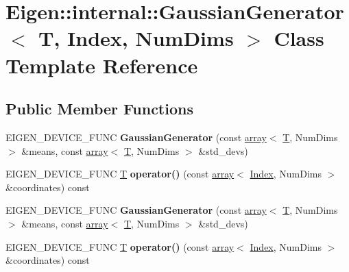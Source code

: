 \hypertarget{class_eigen_1_1internal_1_1_gaussian_generator}{}\section{Eigen\+:\+:internal\+:\+:Gaussian\+Generator$<$ T, Index, Num\+Dims $>$ Class Template Reference}
\label{class_eigen_1_1internal_1_1_gaussian_generator}
\subsection*{Public Member Functions}
\begin{DoxyCompactItemize}
\item 
\mbox{\label{class_eigen_1_1internal_1_1_gaussian_generator_a54fa35a51a93200db4469b4b2b288ea4}} 
E\+I\+G\+E\+N\+\_\+\+D\+E\+V\+I\+C\+E\+\_\+\+F\+U\+NC {\bfseries Gaussian\+Generator} (const \hyperlink{class_eigen_1_1array}{array}$<$ \hyperlink{group___sparse_core___module}{T}, Num\+Dims $>$ \&means, const \hyperlink{class_eigen_1_1array}{array}$<$ \hyperlink{group___sparse_core___module}{T}, Num\+Dims $>$ \&std\+\_\+devs)
\item 
\mbox{\label{class_eigen_1_1internal_1_1_gaussian_generator_a8d19ca5434d3049cade619afd3c2ac8d}} 
E\+I\+G\+E\+N\+\_\+\+D\+E\+V\+I\+C\+E\+\_\+\+F\+U\+NC \hyperlink{group___sparse_core___module}{T} {\bfseries operator()} (const \hyperlink{class_eigen_1_1array}{array}$<$ \hyperlink{namespace_eigen_a62e77e0933482dafde8fe197d9a2cfde}{Index}, Num\+Dims $>$ \&coordinates) const
\item 
\mbox{\label{class_eigen_1_1internal_1_1_gaussian_generator_a54fa35a51a93200db4469b4b2b288ea4}} 
E\+I\+G\+E\+N\+\_\+\+D\+E\+V\+I\+C\+E\+\_\+\+F\+U\+NC {\bfseries Gaussian\+Generator} (const \hyperlink{class_eigen_1_1array}{array}$<$ \hyperlink{group___sparse_core___module}{T}, Num\+Dims $>$ \&means, const \hyperlink{class_eigen_1_1array}{array}$<$ \hyperlink{group___sparse_core___module}{T}, Num\+Dims $>$ \&std\+\_\+devs)
\item 
\mbox{\label{class_eigen_1_1internal_1_1_gaussian_generator_a8d19ca5434d3049cade619afd3c2ac8d}} 
E\+I\+G\+E\+N\+\_\+\+D\+E\+V\+I\+C\+E\+\_\+\+F\+U\+NC \hyperlink{group___sparse_core___module}{T} {\bfseries operator()} (const \hyperlink{class_eigen_1_1array}{array}$<$ \hyperlink{namespace_eigen_a62e77e0933482dafde8fe197d9a2cfde}{Index}, Num\+Dims $>$ \&coordinates) const
\end{DoxyCompactItemize}
